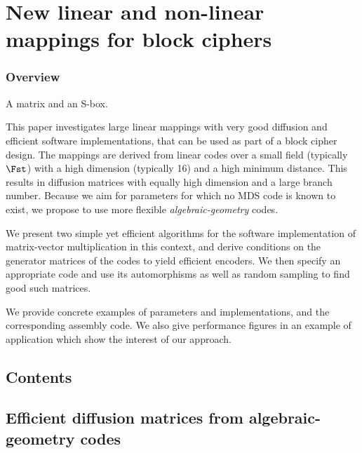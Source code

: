 \part[Nouvelles constructions linéaires et non-linéaires pour chiffres par bloc]
	{New linear and non-linear mappings for block ciphers}
\label{part:constructions}

\section*{Overview}
A matrix and an S-box.

This paper investigates large linear mappings with very good diffusion and efficient software implementations, that
can be used as part of a block cipher design.
The mappings are derived from linear codes
over a small field (typically $\Fst$) with a high dimension (typically 16) and a high minimum distance. This results in
diffusion matrices with equally high dimension and a large branch number.
Because we aim for parameters for which no MDS code is known to exist, we propose to use more flexible \emph{algebraic-geometry} codes.

We present two simple yet efficient algorithms for the software implementation of matrix-vector multiplication in this context, and derive
conditions on the generator matrices of the codes to yield efficient encoders. We then specify an appropriate code and use its automorphisms as well as random sampling
to find good such matrices.

We provide concrete examples of parameters and implementations, and
the corresponding assembly code. We also give performance figures in an example of application
which show the interest of our approach.


\cleardoublepage
\chapter*{Contents}
\parttoc



\chapter[Matrices de diffusions issues de codes géométriques]{Efficient diffusion matrices from algebraic-geometry codes}
\label{cha:difmat}

